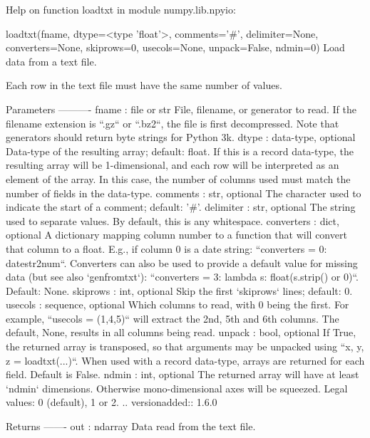 \documentclass{book}
\begin{document}
\begin{VerbOut}
Help on function loadtxt in module numpy.lib.npyio:

loadtxt(fname, dtype=<type 'float'>, comments='#', delimiter=None, converters=None, skiprows=0, usecols=None, unpack=False, ndmin=0)
    Load data from a text file.

    Each row in the text file must have the same number of values.

    Parameters
    ----------
    fname : file or str
        File, filename, or generator to read.  If the filename extension is
        ``.gz`` or ``.bz2``, the file is first decompressed. Note that
        generators should return byte strings for Python 3k.
    dtype : data-type, optional
        Data-type of the resulting array; default: float.  If this is a
        record data-type, the resulting array will be 1-dimensional, and
        each row will be interpreted as an element of the array.  In this
        case, the number of columns used must match the number of fields in
        the data-type.
    comments : str, optional
        The character used to indicate the start of a comment;
        default: '#'.
    delimiter : str, optional
        The string used to separate values.  By default, this is any
        whitespace.
    converters : dict, optional
        A dictionary mapping column number to a function that will convert
        that column to a float.  E.g., if column 0 is a date string:
        ``converters = {0: datestr2num}``.  Converters can also be used to
        provide a default value for missing data (but see also `genfromtxt`):
        ``converters = {3: lambda s: float(s.strip() or 0)}``.  Default: None.
    skiprows : int, optional
        Skip the first `skiprows` lines; default: 0.
    usecols : sequence, optional
        Which columns to read, with 0 being the first.  For example,
        ``usecols = (1,4,5)`` will extract the 2nd, 5th and 6th columns.
        The default, None, results in all columns being read.
    unpack : bool, optional
        If True, the returned array is transposed, so that arguments may be
        unpacked using ``x, y, z = loadtxt(...)``.  When used with a record
        data-type, arrays are returned for each field.  Default is False.
    ndmin : int, optional
        The returned array will have at least `ndmin` dimensions.
        Otherwise mono-dimensional axes will be squeezed.
        Legal values: 0 (default), 1 or 2.
        .. versionadded:: 1.6.0

    Returns
    -------
    out : ndarray
        Data read from the text file.


\end{VerbOut}
\end{document}
